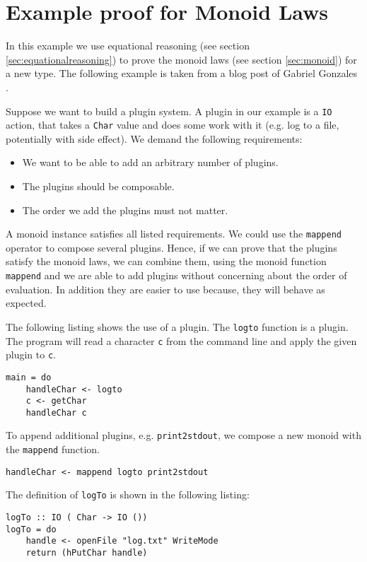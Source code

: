 \section{Example proof for Monoid Laws}
\label{sec:example}
In this example we use equational reasoning (see section \ref{sec:equationalreasoning}) to prove the monoid laws (see section \ref{sec:monoid}) for a new type.
The following example is taken from a blog post of Gabriel Gonzales \cite{gonzales14}. 

Suppose we want to build a plugin system. A plugin in our example is a \verb|IO| action, that takes a \verb|Char| value and does some work with it (e.g. log to a file, potentially with side effect). We demand the following requirements:
\begin{itemize}
\item We want to be able to add an arbitrary number of plugins.
\item The plugins should be composable.
\item The order we add the plugins must not matter.
\end{itemize}

A monoid instance satisfies all listed requirements. We could use the \verb|mappend| operator to compose several plugins. Hence, if we can prove that the plugins satisfy the monoid laws, we can combine them, using the monoid function \verb|mappend| and we are able to add plugins without concerning about the order of evaluation. In addition they are easier to use because, they will behave as expected.

The following listing shows the use of a plugin. The \verb|logto| function is a plugin. The program will read a character \verb|c| from the command line and apply the given plugin to \verb|c|.

\begin{verbatim}
main = do
    handleChar <- logto
    c <- getChar
    handleChar c
\end{verbatim}

To append additional plugins, e.g. \verb|print2stdout|, we compose a new monoid with the \verb|mappend| function.
\begin{verbatim}
handleChar <- mappend logto print2stdout
\end{verbatim}
The definition of \verb|logTo| is shown in the following listing: 

\begin{verbatim}
logTo :: IO ( Char -> IO ())
logTo = do
    handle <- openFile "log.txt" WriteMode
    return (hPutChar handle)
\end{verbatim}

